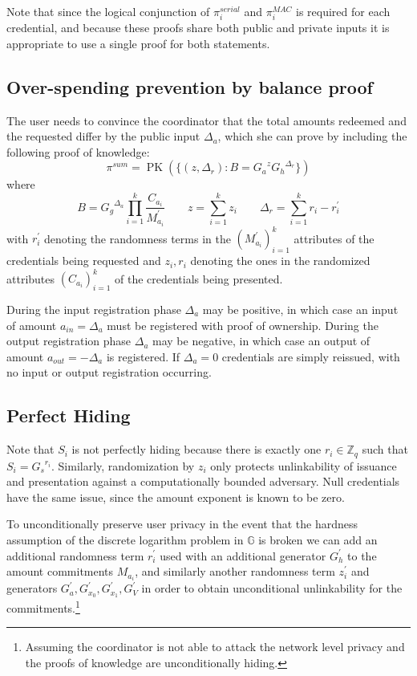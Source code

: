 \documentclass{article}
\begin{document}
Note that since the logical conjunction of $\pi_i^{\mathit{serial}}$ and $\pi_i^{\mathit{MAC}}$ is required for each credential, and because these proofs share both public and private inputs it is appropriate to use a single proof for both statements.

\subsection{Over-spending prevention by balance proof}\label{balance}

The user needs to convince the coordinator that the total amounts redeemed and the requested differ by the public input $\Delta_{a}$, which she can prove by including the following proof of knowledge:
\[ \pi^{\mathit{sum}} = \operatorname{PK}(\{ (z, \Delta_r) : B = {G_a}^{z} {G_h}^{\Delta_r} \})
\]
where
\[
B = {G_g}^{\Delta_a} \prod_{i=1}^k \frac{C_{a_i}}{M^{\prime}_{a_i}}
\qquad
z = \sum_{i=1}^k z_i
\qquad
\Delta_r = \sum_{i=1}^k r_i - r^{\prime}_i
\]
with $r^{\prime}_i$ denoting the randomness terms in the $(M^{\prime}_{a_i})_{i=1}^k$ attributes of the credentials being requested and $z_i, r_i$ denoting the ones in the randomized attributes $(C_{a_i})_{i=1}^k$ of the credentials being presented.

During the input registration phase $\Delta_{a}$ may be positive, in which case an input of amount $a_{\mathit{in}} = \Delta_{a}$ must be registered with proof of ownership. During the output registration phase $\Delta_{a}$ may be negative, in which case an output of amount $a_{\mathit{out}} = -\Delta_{a}$ is registered. If $\Delta_{a} = 0$ credentials are simply reissued, with no input or output registration occurring.

\subsection{Perfect Hiding}

Note that $S_i$ is not perfectly hiding because there is exactly one $r_i \in \mathbb{Z}_q$ such that $S_i = {G_s}^{r_i}$. Similarly, randomization by $z_i$ only protects unlinkability of issuance and presentation against a computationally bounded adversary. Null credentials have the same issue, since the amount exponent is known to be zero.

To unconditionally preserve user privacy in the event that the hardness assumption of the discrete logarithm problem in $\mathbb{G}$ is broken we can add an additional randomness term $r_i^{\prime}$ used with an additional generator $G_h^{\prime}$ to the amount commitments $M_{a_i}$, and similarly another randomness term $z_i^{\prime}$ and generators $G_a^{\prime}, G_{x_0}^{\prime}, G_{x_1}^{\prime}, G_V^{\prime}$ in order to obtain unconditional unlinkability for the commitments.\footnote{Assuming the coordinator is not able to attack the network level privacy and the proofs of knowledge are unconditionally hiding.}
\end{document}
